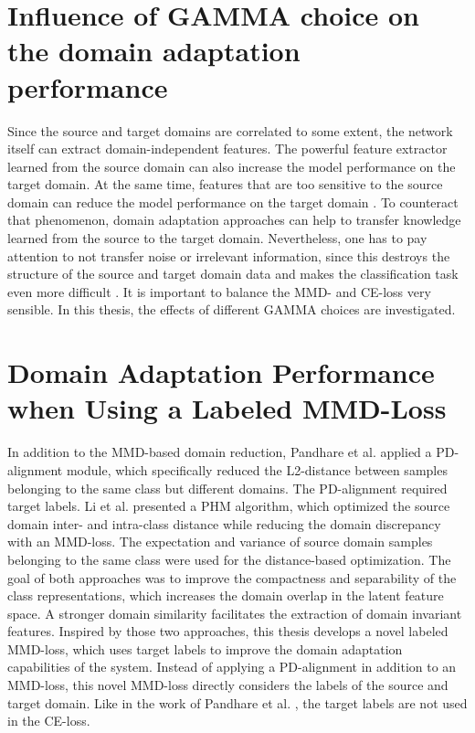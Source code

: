 \section{Influence of GAMMA choice on the domain adaptation performance}
Since the source and target domains are correlated to some extent, the network itself can extract domain-independent features. The powerful feature extractor learned from the source domain can also increase the model performance on the target domain. At the same time, features that are too sensitive to the source domain can reduce the model performance on the target domain \cite{li2020}. To counteract that phenomenon, domain adaptation approaches can help to transfer knowledge learned from the source to the target domain. Nevertheless, one has to pay attention to not transfer noise or irrelevant information, since this destroys the structure of the source and target domain data and makes the classification task even more difficult \cite{li2020}. It is important to balance the MMD- and CE-loss very sensible. In this thesis, the effects of different GAMMA choices are investigated.

\section{Domain Adaptation Performance when Using a Labeled MMD-Loss}
In addition to the MMD-based domain reduction, Pandhare et al. \cite{Pandhare2021} applied a PD-alignment module, which specifically reduced the L2-distance between samples belonging to the same class but different domains. The PD-alignment required target labels. Li et al. \cite{Li2018} presented a PHM algorithm, which optimized the source domain inter- and intra-class distance while reducing the domain discrepancy with an MMD-loss. The expectation and variance of source domain samples belonging to the same class were used for the distance-based optimization. The goal of both approaches was to improve the compactness and separability of the class representations, which increases the domain overlap in the latent feature space. A stronger domain similarity facilitates the extraction of domain invariant features. Inspired by those two approaches, this thesis develops a novel labeled MMD-loss, which uses target labels to improve the domain adaptation capabilities of the system. Instead of applying a PD-alignment in addition to an MMD-loss, this novel MMD-loss directly considers the labels of the source and target domain. Like in the work of Pandhare et al. \cite{Pandhare2021}, the target labels are not used in the CE-loss.

